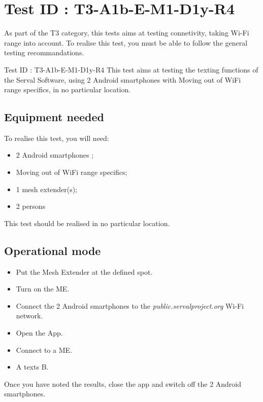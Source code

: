 \documentclass[oneside]{book}
\begin{document}
\section{Test ID : T3-A1b-E-M1-D1y-R4}
\begin{itshape}
As part of the T3 category, this tests aims at testing connetivity, taking Wi-Fi range into account.
To realise this test, you must be able to follow the general testing recommandations.
\end{itshape}
\newline
Test ID : T3-A1b-E-M1-D1y-R4
 This test aims at testing the texting functions of the Serval Software, using 2 Android smartphones with Moving out of WiFi range specifics, in no particular location.
\subsection{Equipment needed} To realise this test, you will need:
\begin{itemize}
\item 2 Android smartphones ;
\item Moving out of WiFi range specifics;
\item 1 mesh extender(s);
\item 2 persons
\end{itemize}
This test should be realised in no particular location.
\subsection{Operational mode} \begin{itemize}
\item Put the Mesh Extender at the defined spot.
\item Turn on the ME.
\item Connect the 2 Android smartphones to the \emph{public.servalproject.org} Wi-Fi network.
\item Open the App.
\item Connect to a ME.
\item A texts B.
\end{itemize}
Once you have noted the results, close the app and switch off the 2 Android smartphones.
\end{document}
